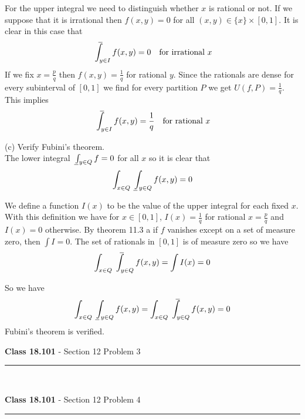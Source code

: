 \documentclass[11pt,reqno]{article}
\def\uint{\mathchoice%
    {\mkern13mu\overline{\vphantom{\intop}\mkern9mu}\mkern-20mu}%
    {\mkern9mu\overline{\vphantom{\intop}\mkern9mu}\mkern-14mu}%
    {\mkern9mu\overline{\vphantom{\intop}\mkern9mu}\mkern-14mu}%
    {\mkern9mu\overline{\vphantom{\intop}\mkern9mu}\mkern-14mu}%
  \int}
\def\lint{\mkern3mu\underline{\vphantom{\intop}\mkern9mu}\mkern-10mu\int}
\begin{document}
For the upper integral we need to distinguish whether $x$ is rational or not. If we suppose that it is irrational then $f(x,y) = 0$ for all $(x,y) \in \{x\} \times [0,1]$. It is clear in this case that 
\[  \uint_{y \in I} f(x,y)  = 0 \quad \text{for irrational $x$} \]
If we fix $x = \frac{p}{q}$ then $f(x,y) = \frac{1}{q}$ for rational $y$. Since the rationals are dense for every subinterval of $[0,1]$ we find for every partition $P$ we get $U(f,P) = \frac{1}{q}$. This implies
\[  \uint_{y \in I} f(x,y)  = \frac{1}{q} \quad \text{for rational $x$} \]

\noindent (c) Verify Fubini's theorem.\\

\noindent The lower integral $\lint_{y \in Q} f = 0$ for all $x$ so it is clear that 
\[ \int_{x \in Q} \lint_{y \in Q} f(x,y) = 0 \]

We define a function $I(x)$ to be the value of the upper integral for each fixed $x$. With this definition we have for $x \in [0,1]$, $I(x) = \frac{1}{q}$ for rational $x = \frac{p}{q}$ and $I(x) = 0$ otherwise. By theorem 11.3 a if $f$ vanishes except on a set of measure zero, then $\int I = 0$. The set of rationals in $[0,1]$ is of measure zero so we have 
\[ \int_{x \in Q} \uint_{y \in Q} f(x,y) =  \int I(x) = 0 \]

\noindent So we have 
\[  \int_{x \in Q} \lint_{y \in Q} f(x,y) = \int_{x \in Q} \uint_{y \in Q} f(x,y) = 0 \]
Fubini's theorem is verified.\\

\begin{flushleft} 
\textbf{Class 18.101} - Section 12 Problem 3\\
\rule{500pt}{1pt}\\
\end{flushleft} 


\begin{flushleft} 
\textbf{Class 18.101} - Section 12 Problem 4\\
\rule{500pt}{1pt}\\
\end{flushleft} 
\end{document}
